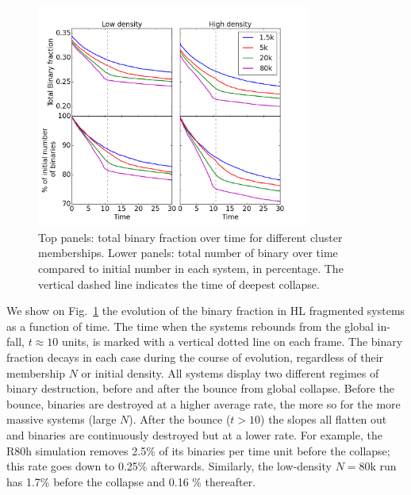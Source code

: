 \begin{figure}
\begin{center}
\includegraphics[width=0.8\textwidth]{Figures/6_TotBinFrac_vs_time}
\caption{ Top panels: total binary fraction over time for different cluster memberships. Lower panels: total number of binary over time compared to initial number in each system, in percentage. The vertical dashed line indicates the time of deepest collapse.  }
\label{Fig:6_TotBinFrac}
\end{center}
\end{figure}

We show on Fig.~\ref{Fig:6_TotBinFrac} the evolution of the binary fraction in HL fragmented systems as a function of time. The time when the systems rebounds from the global in-fall, $t \approx 10$ units, is marked with a vertical dotted line on each frame. The binary fraction decays in each case during the course of evolution, regardless of their membership $N$ or initial density. 
All systems display two different regimes of binary destruction, before and after the bounce from global collapse. Before the bounce, binaries are destroyed at a higher average rate, the more so for the more massive systems (large $N$). 
After the bounce ($t > 10$) the slopes all flatten out and binaries are continuously destroyed but at a lower rate. For example, the R80h simulation removes 2.5\% of its binaries per time unit before the collapse; this rate goes down to 0.25\% afterwards. Similarly, the low-density $N = 80$k run has  1.7\% before the collapse and 0.16 \% thereafter.


